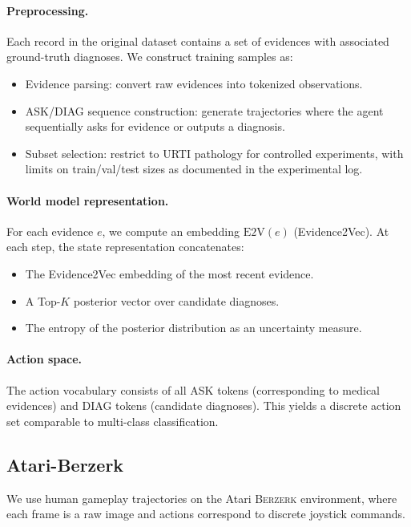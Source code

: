 \documentclass{article} %
\begin{document}
\paragraph{Preprocessing.}
Each record in the original dataset contains a set of evidences with associated ground-truth diagnoses. We construct training samples as:
\begin{itemize}
  \item Evidence parsing: convert raw evidences into tokenized observations.
  \item ASK/DIAG sequence construction: generate trajectories where the agent sequentially asks for evidence or outputs a diagnosis.
  \item Subset selection: restrict to URTI pathology for controlled experiments, with limits on train/val/test sizes as documented in the experimental log.
\end{itemize}

\paragraph{World model representation.}
For each evidence $e$, we compute an embedding $\mathrm{E2V}(e)$ (Evidence2Vec). At each step, the state representation concatenates:
\begin{itemize}
  \item The Evidence2Vec embedding of the most recent evidence.
  \item A Top-$K$ posterior vector over candidate diagnoses.
  \item The entropy of the posterior distribution as an uncertainty measure.
\end{itemize}

\paragraph{Action space.}
The action vocabulary consists of all ASK tokens (corresponding to medical evidences) and DIAG tokens (candidate diagnoses). This yields a discrete action set comparable to multi-class classification.

\subsection{Atari-Berzerk}
\label{Sec:B5}

We use human gameplay trajectories on the Atari \textsc{Berzerk} environment, where each frame is a raw image and actions correspond to discrete joystick commands.
\end{document}
